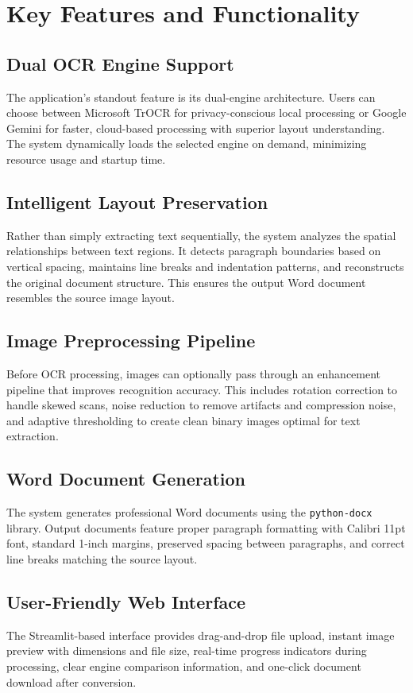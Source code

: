 \documentclass[12pt,a4paper]{article}
\begin{document}
\section{Key Features and Functionality}

\subsection{Dual OCR Engine Support}
The application's standout feature is its dual-engine architecture. Users can choose between Microsoft TrOCR for privacy-conscious local processing or Google Gemini for faster, cloud-based processing with superior layout understanding. The system dynamically loads the selected engine on demand, minimizing resource usage and startup time.

\subsection{Intelligent Layout Preservation}
Rather than simply extracting text sequentially, the system analyzes the spatial relationships between text regions. It detects paragraph boundaries based on vertical spacing, maintains line breaks and indentation patterns, and reconstructs the original document structure. This ensures the output Word document resembles the source image layout.

\subsection{Image Preprocessing Pipeline}
Before OCR processing, images can optionally pass through an enhancement pipeline that improves recognition accuracy. This includes rotation correction to handle skewed scans, noise reduction to remove artifacts and compression noise, and adaptive thresholding to create clean binary images optimal for text extraction.

\subsection{Word Document Generation}
The system generates professional Word documents using the \texttt{python-docx} library. Output documents feature proper paragraph formatting with Calibri 11pt font, standard 1-inch margins, preserved spacing between paragraphs, and correct line breaks matching the source layout.

\subsection{User-Friendly Web Interface}
The Streamlit-based interface provides drag-and-drop file upload, instant image preview with dimensions and file size, real-time progress indicators during processing, clear engine comparison information, and one-click document download after conversion.
\end{document}
